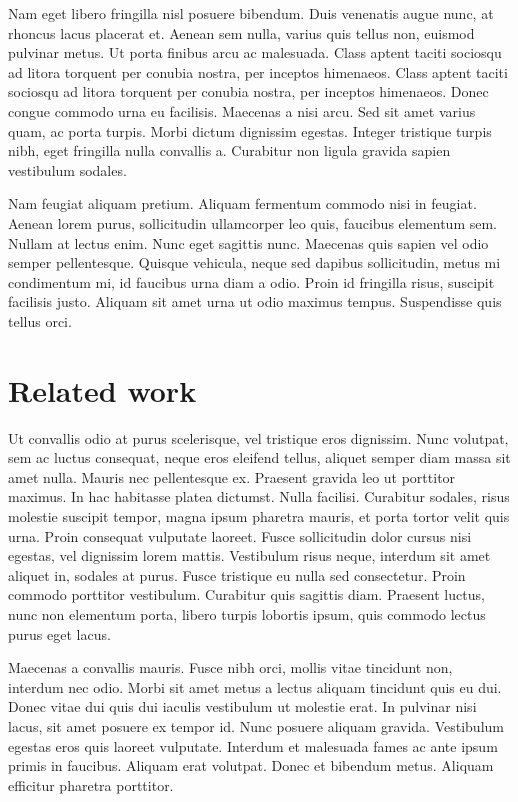\documentclass[final,5p,times,twocolumn]{elsarticle}
\begin{document}
Nam eget libero fringilla nisl posuere bibendum. Duis venenatis augue nunc, at rhoncus lacus placerat et. Aenean sem nulla, varius quis tellus non, euismod pulvinar metus. Ut porta finibus arcu ac malesuada. Class aptent taciti sociosqu ad litora torquent per conubia nostra, per inceptos himenaeos. Class aptent taciti sociosqu ad litora torquent per conubia nostra, per inceptos himenaeos. Donec congue commodo urna eu facilisis. Maecenas a nisi arcu. Sed sit amet varius quam, ac porta turpis. Morbi dictum dignissim egestas. Integer tristique turpis nibh, eget fringilla nulla convallis a. Curabitur non ligula gravida sapien vestibulum sodales.

Nam feugiat aliquam pretium. Aliquam fermentum commodo nisi in feugiat. Aenean lorem purus, sollicitudin ullamcorper leo quis, faucibus elementum sem. Nullam at lectus enim. Nunc eget sagittis nunc. Maecenas quis sapien vel odio semper pellentesque. Quisque vehicula, neque sed dapibus sollicitudin, metus mi condimentum mi, id faucibus urna diam a odio. Proin id fringilla risus, suscipit facilisis justo. Aliquam sit amet urna ut odio maximus tempus. Suspendisse quis tellus orci.

\section{Related work}
\label{sec:rw}

Ut convallis odio at purus scelerisque, vel tristique eros dignissim. Nunc volutpat, sem ac luctus consequat, neque eros eleifend tellus, aliquet semper diam massa sit amet nulla. Mauris nec pellentesque ex. Praesent gravida leo ut porttitor maximus. In hac habitasse platea dictumst. Nulla facilisi. Curabitur sodales, risus molestie suscipit tempor, magna ipsum pharetra mauris, et porta tortor velit quis urna. Proin consequat vulputate laoreet. Fusce sollicitudin dolor cursus nisi egestas, vel dignissim lorem mattis. Vestibulum risus neque, interdum sit amet aliquet in, sodales at purus. Fusce tristique eu nulla sed consectetur. Proin commodo porttitor vestibulum. Curabitur quis sagittis diam. Praesent luctus, nunc non elementum porta, libero turpis lobortis ipsum, quis commodo lectus purus eget lacus.

Maecenas a convallis mauris. Fusce nibh orci, mollis vitae tincidunt non, interdum nec odio. Morbi sit amet metus a lectus aliquam tincidunt quis eu dui. Donec vitae dui quis dui iaculis vestibulum ut molestie erat. In pulvinar nisi lacus, sit amet posuere ex tempor id. Nunc posuere aliquam gravida. Vestibulum egestas eros quis laoreet vulputate. Interdum et malesuada fames ac ante ipsum primis in faucibus. Aliquam erat volutpat. Donec et bibendum metus. Aliquam efficitur pharetra porttitor.
\end{document}

